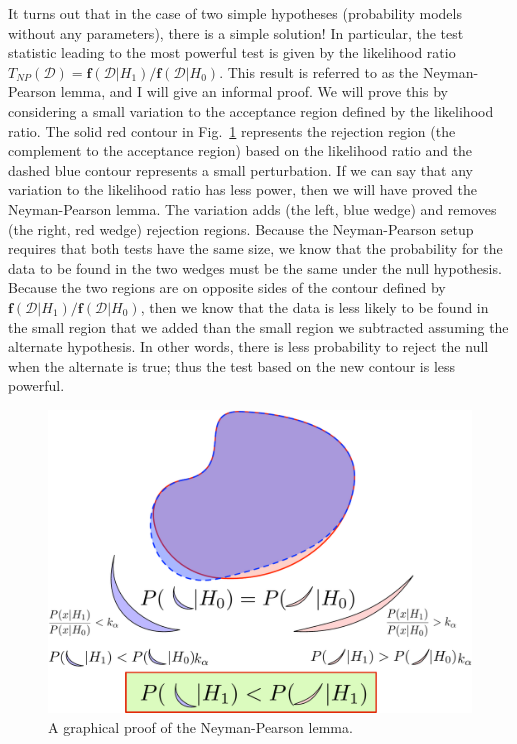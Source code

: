 \documentclass{cernrep}
\newcommand{\data}{{\ensuremath{\mathcal{D}}}}
\newcommand{\f}{{\ensuremath{\mathbf{f}}}}
\begin{document}
It turns out that in the case of two simple hypotheses (probability models without any parameters), there is a simple solution!  In particular, the test statistic leading to the most powerful test is given by the likelihood ratio $T_{NP}(\data) = \f(\data|H_1)/\f(\data|H_0)$.  This result is referred to as the Neyman-Pearson lemma, and I will give an informal proof.  We will prove this by considering a small variation to the acceptance region defined by the likelihood ratio.  The solid red contour in Fig.~\ref{fig:neymanpearson} represents the rejection region (the complement to the acceptance region) based on the likelihood ratio and the dashed blue contour represents a small perturbation.  If we can say that any variation to the likelihood ratio has less power, then we will have proved the Neyman-Pearson lemma.  The variation adds (the left, blue wedge) and removes (the right, red wedge) rejection regions.  Because the Neyman-Pearson setup requires that both tests have the same size, we know that the probability for the data to be found in the two wedges must be the same under the null hypothesis.  Because the two regions are on opposite sides of the contour defined by $ \f(\data|H_1)/\f(\data|H_0)$, then we know that the data is less likely to be found in the small region that we added than the small region we subtracted assuming the alternate hypothesis.  In other words, there is less probability to reject the null when the alternate is true; thus the  test based on the new contour is less powerful.

\begin{figure}[h]
\begin{center}
\includegraphics[width=.65\textwidth]{NeymanPearsonLemma.pdf}
\caption{A graphical proof of the Neyman-Pearson lemma.}
\label{fig:neymanpearson}
\end{center}
\end{figure}
\end{document}
